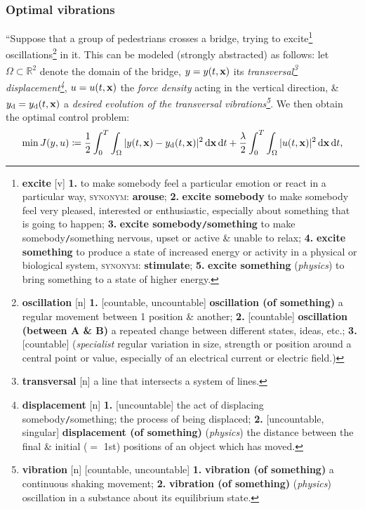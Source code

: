 \documentclass[oneside]{book}
\numberwithin{equation}{section}
\begin{document}
\subsubsection{Optimal vibrations}
``Suppose that a group of pedestrians crosses a bridge, trying to excite\footnote{\textbf{excite} [v] \textbf{1.} to make somebody feel a particular emotion or react in a particular way, \textsc{synonym}: \textbf{arouse}; \textbf{2.} \textbf{excite somebody} to make somebody feel very pleased, interested or enthusiastic, especially about something that is going to happen; \textbf{3.} \textbf{excite somebody\texttt{/}something} to make somebody\texttt{/}something nervous, upset or active \& unable to relax; \textbf{4.} \textbf{excite something} to produce a state of increased energy or activity in a physical or biological system, \textsc{synonym}: \textbf{stimulate}; \textbf{5.} \textbf{excite something} (\textit{physics}) to bring something to a state of higher energy.} oscillations\footnote{\textbf{oscillation} [n] \textbf{1.} [countable, uncountable] \textbf{oscillation (of something)} a regular movement between 1 position \& another; \textbf{2.} [countable] \textbf{oscillation (between A \& B)} a repeated change between different states, ideas, etc.; \textbf{3.} [countable] (\textit{specialist} regular variation in size, strength or position around a central point or value, especially of an electrical current or electric field.)} in it. This can be modeled (strongly abstracted) as follows: let $\Omega\subset\mathbb{R}^2$ denote the domain of the bridge, $y = y(t,{\bf x})$ its \textit{transversal\footnote{\textbf{transversal} [n] a line that intersects a system of lines.} displacement\footnote{\textbf{displacement} [n] \textbf{1.} [uncountable] the act of displacing somebody\texttt{/}something; the process of being displaced; \textbf{2.} [uncountable, singular] \textbf{displacement (of something)} (\textit{physics}) the distance between the final \& initial ($=$ 1st) positions of an object which has moved.}}, $u = u(t,{\bf x})$ the \textit{force density} acting in the vertical direction, \& $y_{\rm d} = y_{\rm d}(t,{\bf x})$ a \textit{desired evolution of the transversal vibrations\footnote{\textbf{vibration} [n] [countable, uncountable] \textbf{1.} \textbf{vibration (of something)} a continuous shaking movement; \textbf{2.} \textbf{vibration (of something)} (\textit{physics}) oscillation in a substance about its equilibrium state.}}. We then obtain the optimal control problem:
\begin{align*}
	\min J(y,u)\coloneqq\frac{1}{2}\int_0^T\int_\Omega |y(t,{\bf x}) - y_{\rm d}(t,{\bf x})|^2\,{\rm d}{\bf x}\,{\rm d}t + \frac{\lambda}{2}\int_0^T\int_\Omega |u(t,{\bf x})|^2\,{\rm d}{\bf x}\,{\rm d}t,
\end{align*}
\end{document}
